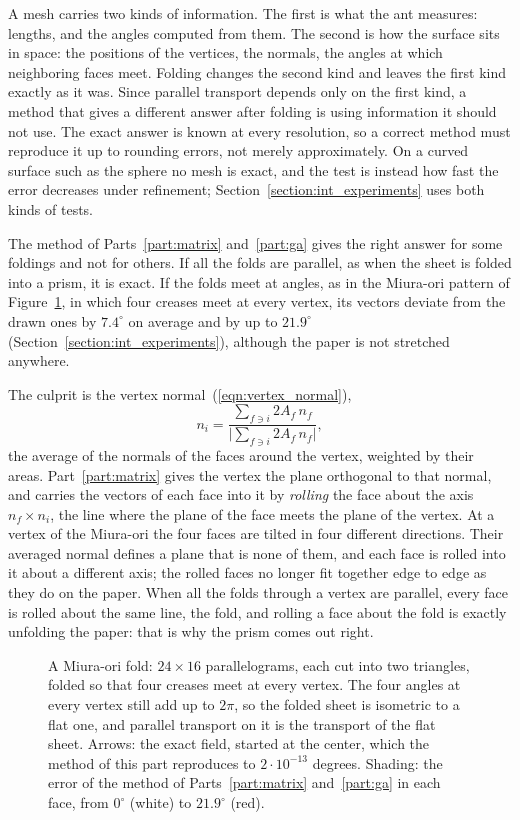 A mesh carries two kinds of information. The first is what the ant measures: lengths, and the angles computed from them. The second is how the surface sits in space: the positions of the vertices, the normals, the angles at which neighboring faces meet. Folding changes the second kind and leaves the first kind exactly as it was. Since parallel transport depends only on the first kind, a method that gives a different answer after folding is using information it should not use. The exact answer is known at every resolution, so a correct method must reproduce it up to rounding errors, not merely approximately. On a curved surface such as the sphere no mesh is exact, and the test is instead how fast the error decreases under refinement; Section~\ref{section:int_experiments} uses both kinds of tests.

The method of Parts~\ref{part:matrix} and~\ref{part:ga} gives the right answer for some foldings and not for others. If all the folds are parallel, as when the sheet is folded into a prism, it is exact. If the folds meet at angles, as in the Miura-ori pattern of Figure~\ref{fig:miura}, in which four creases meet at every vertex, its vectors deviate from the drawn ones by $7.4^\circ$ on average and by up to $21.9^\circ$ (Section~\ref{section:int_experiments}), although the paper is not stretched anywhere.

The culprit is the vertex normal~(\ref{eqn:vertex_normal}),
\begin{equation*}
n_i = \frac{\sum_{f \ni i} 2 A_f\, n_f}{\big|\sum_{f \ni i} 2 A_f\, n_f\big|} ,
\end{equation*}
the average of the normals of the faces around the vertex, weighted by their areas. Part~\ref{part:matrix} gives the vertex the plane orthogonal to that normal, and carries the vectors of each face into it by \emph{rolling} the face about the axis $n_f \times n_i$, the line where the plane of the face meets the plane of the vertex. At a vertex of the Miura-ori the four faces are tilted in four different directions. Their averaged normal defines a plane that is none of them, and each face is rolled into it about a different axis; the rolled faces no longer fit together edge to edge as they do on the paper. When all the folds through a vertex are parallel, every face is rolled about the same line, the fold, and rolling a face about the fold is exactly unfolding the paper: that is why the prism comes out right.
\begin{figure}[t]
\centering
{}
\caption{A Miura-ori fold: $24 \times 16$ parallelograms, each cut into two triangles, folded so that four creases meet at every vertex. The four angles at every vertex still add up to $2\pi$, so the folded sheet is isometric to a flat one, and parallel transport on it is the transport of the flat sheet. Arrows: the exact field, started at the center, which the method of this part reproduces to $2 \cdot 10^{-13}$ degrees. Shading: the error of the method of Parts~\ref{part:matrix} and~\ref{part:ga} in each face, from $0^\circ$ (white) to $21.9^\circ$ (red).}
\label{fig:miura}
\end{figure}


